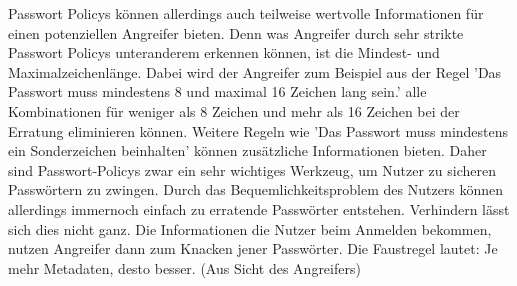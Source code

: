 Passwort Policys können allerdings auch teilweise wertvolle Informationen für einen potenziellen Angreifer bieten. Denn was Angreifer durch sehr strikte Passwort Policys unteranderem erkennen können, ist die Mindest- und Maximalzeichenlänge. Dabei wird der Angreifer zum Beispiel aus der Regel 'Das Passwort muss mindestens 8 und maximal 16 Zeichen lang sein.' alle Kombinationen für weniger als 8 Zeichen und mehr als 16 Zeichen bei der Erratung eliminieren können. Weitere Regeln wie 'Das Passwort muss mindestens ein Sonderzeichen beinhalten' können zusätzliche Informationen bieten. Daher sind Passwort-Policys zwar ein sehr wichtiges Werkzeug, um Nutzer zu sicheren Passwörtern zu zwingen. Durch das Bequemlichkeitsproblem des Nutzers können allerdings immernoch einfach zu erratende Passwörter entstehen. Verhindern lässt sich dies nicht ganz. Die Informationen die Nutzer beim Anmelden bekommen, nutzen Angreifer dann zum Knacken jener Passwörter. Die Faustregel lautet: Je mehr Metadaten, desto besser. (Aus Sicht des Angreifers)

